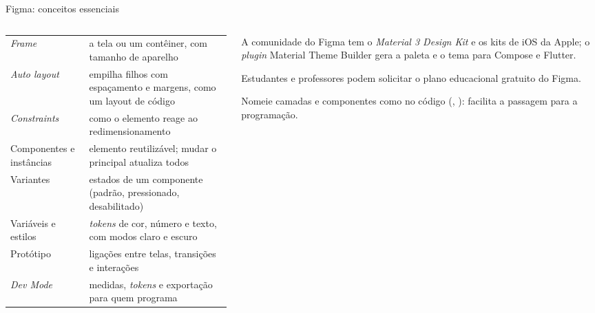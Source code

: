 \documentclass[aspectratio=169,10pt]{beamer}
\begin{document}
\begin{frame}{Figma: conceitos essenciais}
  \begin{columns}[T]
    \begin{column}{0.5\textwidth}
      \scriptsize
      \begin{tabularx}{\linewidth}{@{}l L@{}}
        \toprule
         &  \\
        \midrule
        \emph{Frame} & a tela ou um contêiner, com tamanho de aparelho \\
        \emph{Auto layout} & empilha filhos com espaçamento e margens, como um layout de código \\
        \emph{Constraints} & como o elemento reage ao redimensionamento \\
        Componentes e instâncias & elemento reutilizável; mudar o principal atualiza todos \\
        Variantes & estados de um componente (padrão, pressionado, desabilitado) \\
        Variáveis e estilos & \emph{tokens} de cor, número e texto, com modos claro e escuro \\
        Protótipo & ligações entre telas, transições e interações \\
        \emph{Dev Mode} & medidas, \emph{tokens} e exportação para quem programa \\
        \bottomrule
      \end{tabularx}
    \end{column}
    \begin{column}{0.48\textwidth}
      \begin{dica}
        A comunidade do Figma tem o \emph{Material 3 Design Kit} e os kits de iOS da Apple; o \emph{plugin} Material Theme Builder gera a paleta e o tema para Compose e Flutter.
      \end{dica}
      \begin{dica}
        Estudantes e professores podem solicitar o plano educacional gratuito do Figma.
      \end{dica}
      \begin{atencao}
        Nomeie camadas e componentes como no código (, ): facilita a passagem para a programação.
      \end{atencao}
    \end{column}
  \end{columns}
\end{frame}
\end{document}
